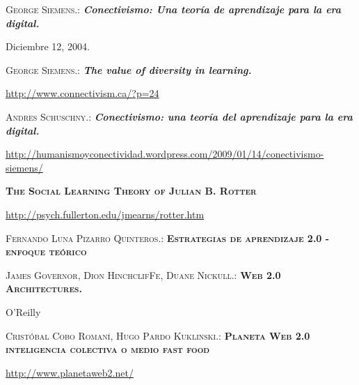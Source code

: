 \documentclass[letter,11pt,oneside,spanish]{article}
\begin{document}
\newpage
\begin{thebibliography}{99}
  \textsc{George Siemens.:}
              \textit{\textbf{Conectivismo: Una teor\'ia de aprendizaje para la era digital.}}
              \par Diciembre 12, 2004.

  \textsc{George Siemens.:}
            \textit{\textbf{The value of diversity in learning.}}
            \par \url{http://www.connectivism.ca/?p=24}

  \textsc{Andres Schuschny.:}
             \textit{\textbf{Conectivismo: una teor\'ia del aprendizaje para la era digital.}}
             \par \url{http://humanismoyconectividad.wordpress.com/2009/01/14/conectivismo-siemens/}

  \textsc{\textbf{The Social Learning Theory of Julian B. Rotter}}
                 \par \url{http://psych.fullerton.edu/jmearns/rotter.htm}
 
  \textsc{Fernando Luna Pizarro Quinteros.:}
                       \textsc{\textbf{Estrategias de aprendizaje 2.0 - enfoque te\'orico}}

  \textsc{James Governor, Dion HinchclifFe, Duane Nickull.:}
               \textsc{\textbf{ Web 2.0 Architectures.}}
               \par O'Reilly
                                       
  \textsc{Crist\'obal Cobo Roman\'i, Hugo Pardo Kuklinski.:}
                  \textsc{\textbf{Planeta Web 2.0 inteligencia colectiva o medio fast food}}
                  \par \url{http://www.planetaweb2.net/}                   
  
\end{thebibliography}
\end{document}
